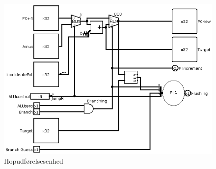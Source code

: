 \documentclass[10pt,a4paper,danish]{article}
\begin{document}
\begin{figure}[htb]
\begin{center}
\leavevmode
\includegraphics[scale=0.50]{jump_and_branch_excecutor.png}
\end{center}
\caption{Hopudførelsesenhed}
\label{fig:jabe} 
\end{figure}
\end{document}
